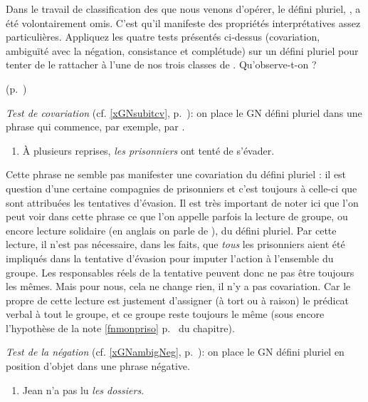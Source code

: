 \begin{exo}\label{exo:DefPlur}
Dans le travail de classification des {\GN} que nous venons d'opérer, 
%
le défini pluriel, , a été volontairement omis. 
C'est qu'il manifeste des propriétés interprétatives assez particulières.
Appliquez les quatre tests présentés ci-dessus (covariation, ambiguïté avec la négation, consistance et complétude) sur un défini pluriel pour tenter de le rattacher à l'une de nos trois classes de {\GN}.  Qu'observe-t-on ? 
%
\begin{solu} (p.~\pageref{exo:DefPlur})\label{crg:DefPlur}

\noindent\emph{Test de covariation} (cf. \ref{xGNsubitcv}, p.~\pageref{xGNsubitcv}): on place le GN défini pluriel dans une phrase qui commence, par exemple, par .

\begin{enumerate}[label=(\arabic*)]
\item À plusieurs reprises, \emph{les prisonniers} ont tenté de \label{xpriso-f}s'évader.
\end{enumerate}

Cette phrase ne semble pas manifester une covariation du défini pluriel : il est question d'une certaine compagnies de prisonniers et c'est toujours à celle-ci que sont attribuées les tentatives d'évasion.
Il est très important de noter ici que l'on peut voir dans cette phrase ce que l'on appelle parfois la lecture de groupe, ou encore lecture solidaire (en anglais on parle de ), du défini pluriel. Par cette lecture, il n'est pas nécessaire, dans les faits, que \emph{tous} les prisonniers aient été impliqués dans la tentative d'évasion pour imputer l'action à l'ensemble du groupe. Les responsables réels de la tentative peuvent donc ne pas être toujours les mêmes. Mais pour nous, cela ne change rien, il n'y a pas covariation.  Car le propre de cette lecture est justement d'assigner (à tort ou à raison) le prédicat verbal  à tout le groupe, et ce groupe reste toujours le même (sous encore l'hypothèse de la note \ref{fnmonpriso} p.~\pageref{fnmonpriso} du chapitre).  

\smallskip

\noindent\emph{Test de la négation} (cf. \ref{xGNambigNeg}, p.~\pageref{xGNambigNeg}): on place le GN défini pluriel en position d'objet dans une phrase négative.

\begin{enumerate}[label=(\arabic*),resume]
\item Jean n'a pas lu \emph{les dossiers}.\label{jnapaslulesd}
\end{enumerate}


\end{solu}
\end{exo}
